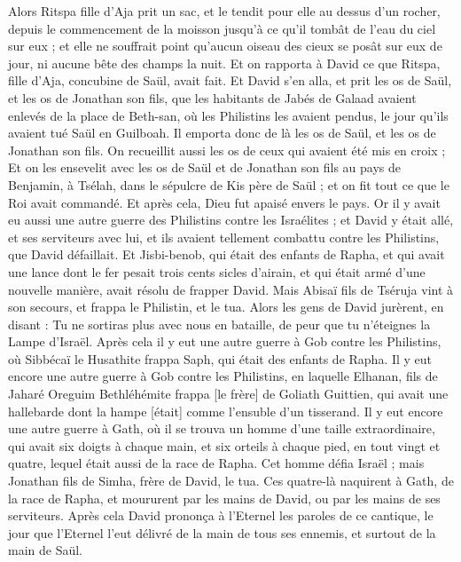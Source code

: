 \begin{multicols}{2}
Alors Ritspa fille d'Aja prit un sac, et le tendit pour elle au dessus d'un rocher, depuis le commencement de la moisson jusqu'à ce qu'il tombât de l'eau du ciel sur eux ; et elle ne souffrait point qu'aucun oiseau des cieux se posât sur eux de jour, ni aucune bête des champs la nuit.
Et on rapporta à David ce que Ritspa, fille d'Aja, concubine de Saül, avait fait.
Et David s'en alla, et prit les os de Saül, et les os de Jonathan son fils, que les habitants de Jabés de Galaad avaient enlevés de la place de Beth-san, où les Philistins les avaient pendus, le jour qu'ils avaient tué Saül en Guilboah.
Il emporta donc de là les os de Saül, et les os de Jonathan son fils. On recueillit aussi les os de ceux qui avaient été mis en croix ;
Et on les ensevelit avec les os de Saül et de Jonathan son fils au pays de Benjamin, à Tsélah, dans le sépulcre de Kis père de Saül ; et on fit tout ce que le Roi avait commandé. Et après cela, Dieu fut apaisé envers le pays.
Or il y avait eu aussi une autre guerre des Philistins contre les Israélites ; et David y était allé, et ses serviteurs avec lui, et ils avaient tellement combattu contre les Philistins, que David défaillait.
Et Jisbi-benob, qui était des enfants de Rapha, et qui avait une lance dont le fer pesait trois cents sicles d'airain, et qui était armé d'une nouvelle manière, avait résolu de frapper David.
Mais Abisaï fils de Tséruja vint à son secours, et frappa le Philistin, et le tua. Alors les gens de David jurèrent, en disant : Tu ne sortiras plus avec nous en bataille, de peur que tu n'éteignes la Lampe d'Israël.
Après cela il y eut une autre guerre à Gob contre les Philistins, où Sibbécaï le Husathite frappa Saph, qui était des enfants de Rapha.
Il y eut encore une autre guerre à Gob contre les Philistins, en laquelle Elhanan, fils de Jaharé Oreguim Bethléhémite frappa [le frère] de Goliath Guittien, qui avait une hallebarde dont la hampe [était] comme l'ensuble d'un tisserand.
Il y eut encore une autre guerre à Gath, où il se trouva un homme d'une taille extraordinaire, qui avait six doigts à chaque main, et six orteils à chaque pied, en tout vingt et quatre, lequel était aussi de la race de Rapha.
Cet homme défia Israël ; mais Jonathan fils de Simha, frère de David, le tua.
Ces quatre-là naquirent à Gath, de la race de Rapha, et moururent par les mains de David, ou par les mains de ses serviteurs.
\VerseOne{}Après cela David prononça à l'Eternel les paroles de ce cantique, le jour que l'Eternel l'eut délivré de la main de tous ses ennemis, et surtout de la main de Saül.

\end{multicols}
